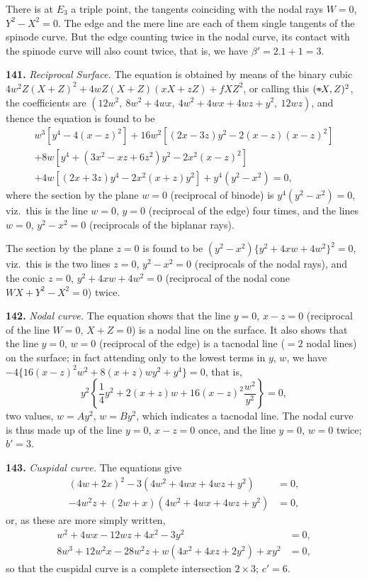 \documentclass[11pt,a4paper]{article}
\theoremstyle{definition}
\begin{document}
There is at $E_3$ a triple point, the tangents coinciding with the nodal rays $W=0$, $Y^2-X^2=0$. The edge and the mere line are each of them single tangents of the spinode curve. But the edge counting twice in the nodal curve, its contact with the spinode curve will also count twice, that is, we have $\beta'=2.1+1=3$.

\setcounter{page}{428}

\noindent\textbf{141.} \textit{Reciprocal Surface.} The equation is obtained by means of the binary cubic $4w^2Z(X+Z)^2 + 4wZ(X+Z)(xX+zZ) + fXZ^2$, or calling this $({*}\!\hbox{\hspace{-0.5em}}\raisebox{0.3ex}{$\scriptstyle\frown$}\!X,Z)^2$, the coefficients are $(12w^2,\ 8w^2+4wx,\ 4w^2+4wx+4wz+y^2,\ 12wz)$, and thence the equation is found to be
\begin{multline*}
w^3[y^4-4(x-z)^2] + 16w^2[(2x-3z)y^2-2(x-z)(x-z)^2] \\
+8w[y^4+(3x^2-xz+6z^2)y^2-2x^2(x-z)^2] \\
+4w[(2x+3z)y^4-2x^2(x+z)y^2]+y^4(y^2-x^2)=0,
\end{multline*}
where the section by the plane $w=0$ (reciprocal of binode) is $y^4(y^2-x^2)=0$, viz.\ this is the line $w=0$, $y=0$ (reciprocal of the edge) four times, and the lines $w=0$, $y^2-x^2=0$ (reciprocals of the biplanar rays).

The section by the plane $z=0$ is found to be $(y^2-x^2)\{y^2+4xw+4w^2\}^2=0$, viz.\ this is the two lines $z=0$, $y^2-x^2=0$ (reciprocals of the nodal rays), and the conic $z=0$, $y^2+4xw+4w^2=0$ (reciprocal of the nodal cone $WX+Y^2-X^2=0$) twice.

\noindent\textbf{142.} \textit{Nodal curve.} The equation shows that the line $y=0$, $x-z=0$ (reciprocal of the line $W=0$, $X+Z=0$) is a nodal line on the surface. It also shows that the line $y=0$, $w=0$ (reciprocal of the edge) is a tacnodal line ($=2$ nodal lines) on the surface; in fact attending only to the lowest terms in $y$, $w$, we have $-4\{16(x-z)^2w^2+8(x+z)wy^2+y^4\}=0$, that is,
\[
y^2\left\{\frac{1}{4}y^2+2(x+z)w+16(x-z)^2\frac{w^2}{y^2}\right\}=0,
\]
two values, $w=Ay^2$, $w=By^2$, which indicates a tacnodal line. The nodal curve is thus made up of the line $y=0$, $x-z=0$ once, and the line $y=0$, $w=0$ twice; $b'=3$.

\noindent\textbf{143.} \textit{Cuspidal curve.} The equations give
\begin{align*}
(4w+2x)^2-3(4w^2+4wx+4wz+y^2) &=0,\\
-4w^2z+(2w+x)(4w^2+4wx+4wz+y^2) &=0,
\end{align*}
or, as these are more simply written,
\begin{align*}
w^2+4wx-12wz+4x^2-3y^2 &=0,\\
8w^3+12w^2x-28w^2z+w(4x^2+4xz+2y^2)+xy^2 &=0,
\end{align*}
so that the cuspidal curve is a complete intersection $2\times 3$; $c'=6$.
\end{document}
